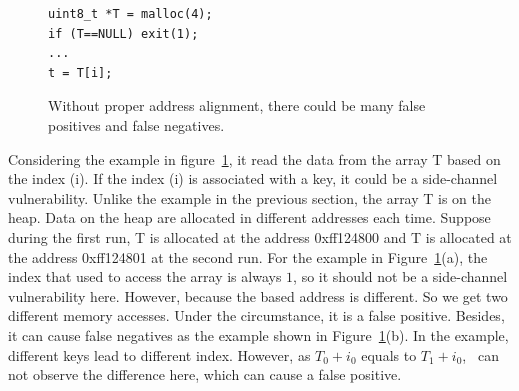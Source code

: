\begin{figure}[h]
  \begin{minipage}{0.45\linewidth}
    \begin{lstlisting}[numbers=none,xleftmargin=.1\textwidth,xrightmargin=.2\textwidth]
uint8_t *T = malloc(4);
if (T==NULL) exit(1);
...
t = T[i];    
\end{lstlisting}
  \end{minipage}
  \hfill
  \begin{minipage}{0.5\linewidth}
  \end{minipage}
  \caption{Without proper address alignment, there could be many false positives and false negatives.}\label{fig:align}
\end{figure}

Considering the example in figure~\ref{fig:align}, it read the data from the array \textsf{T} based on the index (i). If the index (i) is associated with a key, it could be a side-channel vulnerability. Unlike the example in the previous section, the array \textsf{T} is on the heap. Data on the heap are allocated in different addresses each time. Suppose during the first run, \textsf{T} is allocated at the address \textsf{0xff124800} and \textsf{T} is allocated at the address \textsf{0xff124801} at the second run. For the example in Figure~\ref{fig:align}(a), the index that used to access the array is always $1$, so it should not be a side-channel vulnerability here. However, because the based address is different. So we get two different memory accesses. Under the circumstance, it is a false positive. Besides, it can cause false negatives as the example shown in Figure~\ref{fig:align}(b). In the example, different keys lead to different index. However, as $T_0 + i_0$ equals to $T_1 + i_0$, \ can not observe the difference here, which can cause a false positive.

